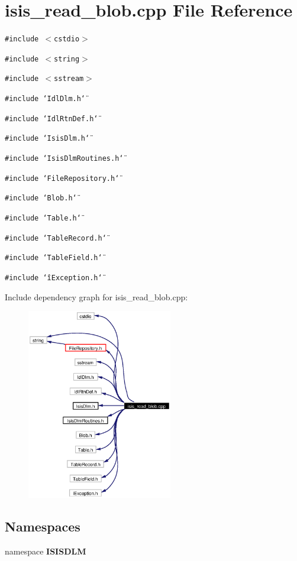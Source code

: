 \section{isis\_\-read\_\-blob.cpp File Reference}
\label{isis__read__blob_8cpp}
{\tt \#include $<$cstdio$>$}\par
{\tt \#include $<$string$>$}\par
{\tt \#include $<$sstream$>$}\par
{\tt \#include \char`\"{}Idl\-Dlm.h\char`\"{}}\par
{\tt \#include \char`\"{}Idl\-Rtn\-Def.h\char`\"{}}\par
{\tt \#include \char`\"{}Isis\-Dlm.h\char`\"{}}\par
{\tt \#include \char`\"{}Isis\-Dlm\-Routines.h\char`\"{}}\par
{\tt \#include \char`\"{}File\-Repository.h\char`\"{}}\par
{\tt \#include \char`\"{}Blob.h\char`\"{}}\par
{\tt \#include \char`\"{}Table.h\char`\"{}}\par
{\tt \#include \char`\"{}Table\-Record.h\char`\"{}}\par
{\tt \#include \char`\"{}Table\-Field.h\char`\"{}}\par
{\tt \#include \char`\"{}i\-Exception.h\char`\"{}}\par


Include dependency graph for isis\_\-read\_\-blob.cpp:\begin{figure}[H]
\begin{center}
\leavevmode
\includegraphics[width=180pt]{isis__read__blob_8cpp__incl}
\end{center}
\end{figure}
\subsection*{Namespaces}
\begin{CompactItemize}
\item 
namespace {\bf ISISDLM}
\end{CompactItemize}
